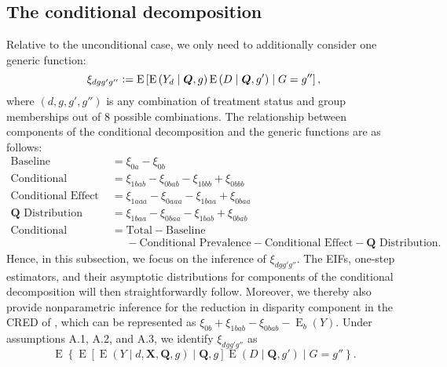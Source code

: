 \documentclass[12pt,a4paper]{article}
\newcommand{\E}{\operatorname{E}}
\def\X{{\boldsymbol X}}
\def\Q{{\boldsymbol Q}}
\newcommand{\defeq}{\vcentcolon=}
\begin{document}
\subsection{The conditional decomposition}
Relative to the unconditional case, we only need to additionally consider one generic function:
$$\xi_{dgg'g''} \defeq \E \left[\E \left(Y_d   \mid \Q, g \right) \E \left(D \mid \Q, g' \right) \mid G=g'' \right],$$
where $(d, g, g', g'')$ is any combination of treatment status and group memberships out of  8 possible combinations. The relationship between components of the conditional decomposition and the generic functions are as follows:
\begin{align*}
    \text{Baseline} &= \xi_{0a}-\xi_{0b}  \\
    \text{Conditional Prevalence} &= \xi_{1bab}-\xi_{0bab}-\xi_{1bbb}+\xi_{0bbb} \\
    \text{Conditional Effect} &= \xi_{1aaa}-\xi_{0aaa} - \xi_{1baa}+\xi_{0baa} \\
    \Q \text{ Distribution} &= \xi_{1baa}-\xi_{0baa} - \xi_{1bab}+\xi_{0bab} \\
    \text{Conditional Selection} &= \text{Total} - \text{Baseline} \\
    &\phantom{{}={}} - \text{Conditional Prevalence} - \text{Conditional Effect} - \Q \text{ Distribution}.
\end{align*}
Hence, in this subsection, we focus on the inference of $\xi_{dgg'g''}$. The EIFs,  one-step estimators, and their asymptotic distributions for components of the conditional decomposition will then straightforwardly follow. Moreover, we thereby also provide nonparametric inference for the reduction in disparity component in the CRED of \citet{jackson_meaningful_2021}, which can be represented as $\xi_{0b}+\xi_{1bab}-\xi_{0bab}-\E_b(Y)$.
Under assumptions A.1, A.2, and A.3, we identify $\xi_{dgg'g''}$ as $$\E \left\{\E \left[ \E(Y \mid d,\X,\Q,g)   \mid \Q, g \right] \E \left(D \mid \Q, g' \right) \mid G=g'' \right\}.$$
\end{document}
